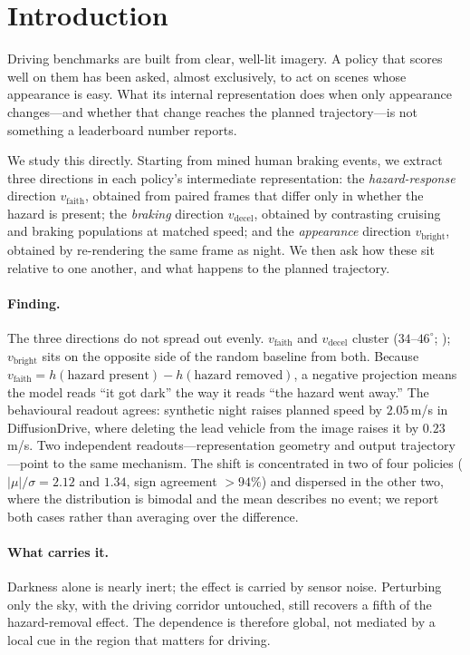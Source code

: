 \section{Introduction}
\label{sec:intro}

Driving benchmarks are built from clear, well-lit imagery. A policy that scores well on them
has been asked, almost exclusively, to act on scenes whose appearance is easy. What its
internal representation does when only appearance changes---and whether that change reaches
the planned trajectory---is not something a leaderboard number reports.

We study this directly. Starting from mined human braking events, we extract three directions
in each policy's intermediate representation: the \emph{hazard-response} direction
$v_{\mathrm{faith}}$, obtained from paired frames that differ only in whether the hazard is
present; the \emph{braking} direction $v_{\mathrm{decel}}$, obtained by contrasting cruising
and braking populations at matched speed; and the \emph{appearance} direction
$v_{\mathrm{bright}}$, obtained by re-rendering the same frame as night. We then ask how these
sit relative to one another, and what happens to the planned trajectory.

\paragraph{Finding.} The three directions do not spread out evenly. $v_{\mathrm{faith}}$ and
$v_{\mathrm{decel}}$ cluster ($34$--$46^\circ$; ); $v_{\mathrm{bright}}$
sits on the opposite side of the random baseline from both. Because
$v_{\mathrm{faith}} = h(\text{hazard present}) - h(\text{hazard removed})$, a negative
projection means the model reads ``it got dark'' the way it reads ``the hazard went away.''
The behavioural readout agrees: synthetic night raises planned speed by $2.05$\,m/s in
DiffusionDrive, where deleting the lead vehicle from the image raises it by $0.23$\,m/s. Two
independent readouts---representation geometry and output trajectory---point to the same
mechanism. The shift is concentrated in two of four policies ($|\mu|/\sigma = 2.12$ and $1.34$,
sign agreement $>94\%$) and dispersed in the other two, where the distribution is bimodal and
the mean describes no event; we report both cases rather than averaging over the difference.

\paragraph{What carries it.} Darkness alone is nearly inert; the effect is carried by sensor
noise. Perturbing only the sky, with the driving corridor untouched, still recovers a fifth of
the hazard-removal effect. The dependence is therefore global, not mediated by a local cue in
the region that matters for driving.

